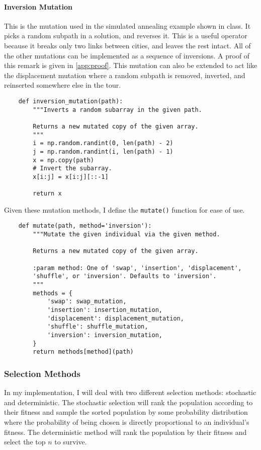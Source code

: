 \documentclass{article}
\begin{document}
\paragraph{Inversion Mutation} This is the mutation used in the simulated annealing example shown
in class. It picks a random subpath in a solution, and reverses it. This is a useful operator
because it breaks only two links between cities, and leaves the rest intact. All of the other
mutations can be implemented as a sequence of inversions. A proof of this remark is given in
\autoref{app:proof}. This mutation can also be extended to act like the displacement mutation where
a random subpath is removed, inverted, and reinserted somewhere else in the tour.
\begin{verbatim}
    def inversion_mutation(path):
        """Inverts a random subarray in the given path.

        Returns a new mutated copy of the given array.
        """
        i = np.random.randint(0, len(path) - 2)
        j = np.random.randint(i, len(path) - 1)
        x = np.copy(path)
        # Invert the subarray.
        x[i:j] = x[i:j][::-1]

        return x
\end{verbatim}

Given these mutation methods, I define the \texttt{mutate()} function for ease of use.

\begin{verbatim}
    def mutate(path, method='inversion'):
        """Mutate the given individual via the given method.

        Returns a new mutated copy of the given array.

        :param method: One of 'swap', 'insertion', 'displacement',
        'shuffle', or 'inversion'. Defaults to 'inversion'.
        """
        methods = {
            'swap': swap_mutation,
            'insertion': insertion_mutation,
            'displacement': displacement_mutation,
            'shuffle': shuffle_mutation,
            'inversion': inversion_mutation,
        }
        return methods[method](path)
\end{verbatim}

\subsubsection{Selection Methods}
In my implementation, I will deal with two different selection methods: stochastic and
deterministic. The stochastic selection will rank the population according to their fitness and
sample the sorted population by some probability distribution where the probability of being chosen
is directly proportional to an individual's fitness. The deterministic method will rank the
population by their fitness and select the top $n$ to survive.
\end{document}
